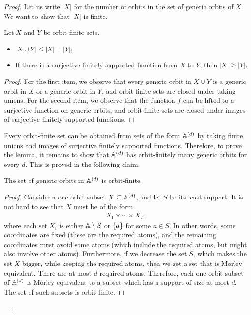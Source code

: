 \begin{proof}
    Let us write $|X|$ for the number of orbits in the set of generic orbits of $X$. We want to show that  $|X|$ is finite. 
	\begin{claim}
		Let $X$ and $Y$ be orbit-finite sets.
		\begin{itemize}
			\item $|X \cup Y| \leq |X| + |Y|$;
			\item If there is a surjective finitely supported function from $X$ to $Y$, then $|X| \ge |Y|$.
		\end{itemize}
	\end{claim}
	\begin{proof}
		For the first item, we observe that every generic orbit in $X \cup Y$ is a generic orbit in $X$ or a generic orbit in $Y$, and orbit-finite sets are closed under taking unions.  For the second item, we observe that the function $f$ can be lifted to a surjective function on generic orbits, and orbit-finite sets are closed under images of surjective finitely supported functions.
	\end{proof}
	Every orbit-finite set can be obtained from sets of the form $\mathbb A^{(d)}$ by taking finite unions and images of surjective finitely supported functions. Therefore, to prove the lemma, it remains to show that $\mathbb A^{(d)}$ has orbit-finitely many generic orbits for every $d$. This is proved in the following claim.
	\begin{claim}
        The set of generic orbits in $\mathbb A^{(d)}$ is orbit-finite. 
	\end{claim}
	\begin{proof}
		Consider a one-orbit subset $X \subseteq \mathbb A^{(d)}$, and let $S$ be its least support. It is not hard to see that $X$ must be of the form 
		\begin{align*}
			X_1 \times \cdots \times X_d,
		\end{align*}
		where each set $X_i$ is either $\mathbb A \setminus S$ or  $\{a\} $ for some $a \in  S$. In other words, some coordinates are fixed (these are the required atoms), and the remaining coordinates must avoid some atoms (which include the required atoms, but might also involve other atoms). Furthermore, if we decrease the set  $S$, which makes the set $X$ bigger, while keeping the required atoms,  then we get a set that is Morley equivalent. There are at most $d$ required atoms.  Therefore, each one-orbit subset of $\mathbb A^{(d)}$ is Morley equivalent to a subset which has a support of size at most $d$. The set of such subsets is orbit-finite.
	\end{proof}
\end{proof}




